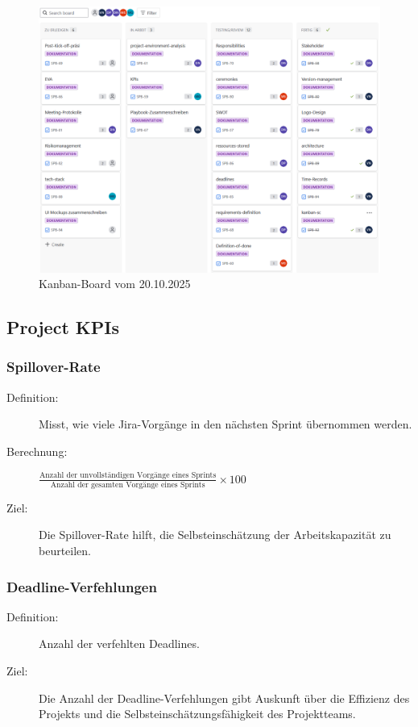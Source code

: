 \documentclass{article}
\begin{document}
\begin{figure}[H]
  \centering
  \includegraphics[width=\textwidth]{kanban_board.png}
  \caption{Kanban-Board vom 20.10.2025}
  \label{fig:kanban-board}
\end{figure}


\subsection{Project KPIs}

\subsubsection{Spillover-Rate}
\begin{description}
  \item[Definition:] Misst, wie viele Jira-Vorgänge in den nächsten Sprint übernommen werden.
  \item[Berechnung:] \(
    \frac{\text{Anzahl der unvollständigen Vorgänge eines Sprints}}
         {\text{Anzahl der gesamten Vorgänge eines Sprints}} \times 100\
  \)
  \item[Ziel:] Die Spillover-Rate hilft, die Selbsteinschätzung der Arbeitskapazität zu beurteilen.
\end{description}

\subsubsection{Deadline-Verfehlungen}
\begin{description}
  \item[Definition:] Anzahl der verfehlten Deadlines.
  \item[Ziel:] Die Anzahl der Deadline-Verfehlungen gibt Auskunft über die Effizienz des Projekts und die Selbsteinschätzungsfähigkeit des Projektteams.
\end{description}
\end{document}
